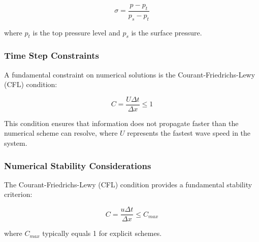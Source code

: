 \documentclass{article}
\begin{document}
\begin{equation}
\sigma = \frac{p - p_t}{p_s - p_t}
\label{eq:62}
\end{equation}

where $p_t$ is the top pressure level and $p_s$ is the surface pressure.

\subsubsection{Time Step Constraints}

A fundamental constraint on numerical solutions is the Courant-Friedrichs-Lewy (CFL) condition:

\begin{equation}
C = \frac{U\Delta t}{\Delta x} \leq 1
\label{eq:63}
\end{equation}

This condition ensures that information does not propagate faster than the numerical scheme can resolve, where $U$ represents the fastest wave speed in the system.

\subsubsection{Numerical Stability Considerations}

The Courant-Friedrichs-Lewy (CFL) condition provides a fundamental stability criterion:

\begin{equation}
C = \frac{u\Delta t}{\Delta x} \leq C_{max}
\label{eq:64}
\end{equation}

where $C_{max}$ typically equals 1 for explicit schemes.


\clearpage
\end{document}
